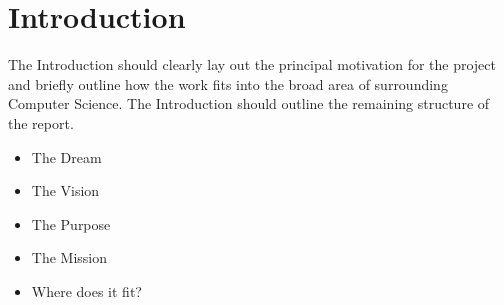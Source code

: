 \chapter{Introduction}
\label{introduction}

The Introduction should clearly lay out the principal motivation for the project
and briefly outline how the work fits into the broad area of surrounding
Computer Science. The Introduction should outline the remaining structure of
the report.

\begin{itemize}
  \item The Dream
  \item The Vision
  \item The Purpose
  \item The Mission
	\item Where does it fit?
\end{itemize}



